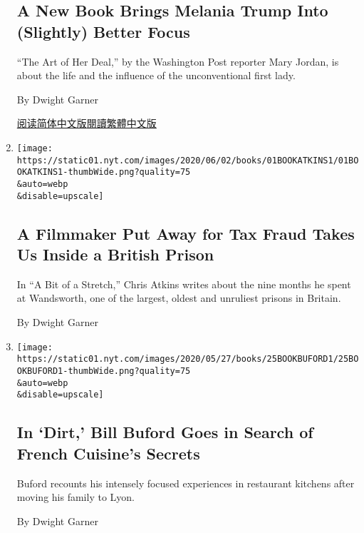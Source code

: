 \begin{enumerate}
  \hypertarget{a-new-book-brings-melania-trump-into-slightly-better-focus}{%
  \subsection{A New Book Brings Melania Trump Into (Slightly) Better
  Focus}\label{a-new-book-brings-melania-trump-into-slightly-better-focus}}

  ``The Art of Her Deal,'' by the Washington Post reporter Mary Jordan,
  is about the life and the influence of the unconventional first lady.

  By Dwight Garner

  \href{https://cn.nytimes.com/usa/20200617/review-art-of-her-deal-melania-trump-mary-jordan/}{阅读简体中文版}\href{https://cn.nytimes.com/usa/20200617/review-art-of-her-deal-melania-trump-mary-jordan/zh-hant/}{閱讀繁體中文版}
\item
  \href{/2020/06/01/books/review-bit-of-stretch-prisoner-diaries-chris-atkins.html}{}

  \texttt{[image: https://static01.nyt.com/images/2020/06/02/books/01BOOKATKINS1/01BOOKATKINS1-thumbWide.png?quality=75\\\&auto=webp\\\&disable=upscale]}

  \hypertarget{a-filmmaker-put-away-for-tax-fraud-takes-us-inside-a-british-prison}{%
  \subsection{A Filmmaker Put Away for Tax Fraud Takes Us Inside a
  British
  Prison}\label{a-filmmaker-put-away-for-tax-fraud-takes-us-inside-a-british-prison}}

  In ``A Bit of a Stretch,'' Chris Atkins writes about the nine months
  he spent at Wandsworth, one of the largest, oldest and unruliest
  prisons in Britain.

  By Dwight Garner
\item
  \href{/2020/05/25/books/review-dirt-bill-buford.html}{}

  \texttt{[image: https://static01.nyt.com/images/2020/05/27/books/25BOOKBUFORD1/25BOOKBUFORD1-thumbWide.png?quality=75\\\&auto=webp\\\&disable=upscale]}

  \hypertarget{in-dirt-bill-buford-goes-in-search-of-french-cuisines-secrets}{%
  \subsection{In `Dirt,' Bill Buford Goes in Search of French Cuisine's
  Secrets}\label{in-dirt-bill-buford-goes-in-search-of-french-cuisines-secrets}}

  Buford recounts his intensely focused experiences in restaurant
  kitchens after moving his family to Lyon.

  By Dwight Garner
\end{enumerate}

